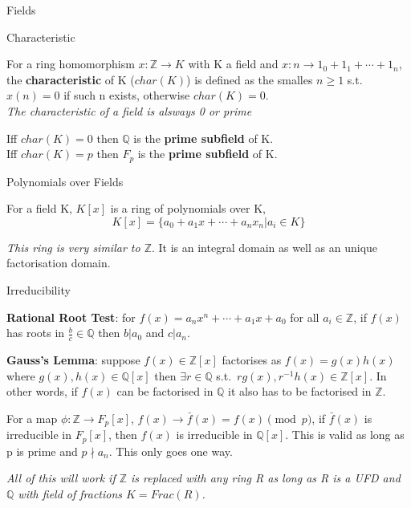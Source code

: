 \documentclass[12pt, letterpaper]{article}
\newcommand{\Q}{\mathbb{Q}}
\newcommand{\Z}{\mathbb{Z}}
\begin{document}
\begin{section}{Fields}

  \begin{subsection}{Characteristic}

    For a ring homomorphism \(x: \Z \to K\) with K a field and
    \(x: n \to 1_{0} + 1_{1} + \cdots + 1_{n}\), the  \textbf{characteristic}
    of K (\(char(K)\)) is defined as the smalles \(n \geq 1\) s.t. \(x(n) = 0\)
    if such n exists, otherwise \(char(K) = 0\). \\
    \textit{The characteristic of a field is alsways 0 or prime}

    Iff \(char(K) = 0\) then \(\Q\) is the \textbf{prime subfield} of
    K. \\
    Iff \(char(K) = p\) then \(F_{p}\) is the \textbf{prime subfield} of K.

  \end{subsection}

  \begin{subsection}{Polynomials over Fields}

    For a field K, \(K[x]\) is a ring of polynomials over K,
    \[K[x] = \{a_{0} + a_{1}x + \cdots + a_{n}x_{n} | a_{i} \in K\}{}\]

    \textit{This ring is very similar to \(\Z\)}. It is an integral
    domain as well as an unique factorisation domain.

    \begin{subsubsection}{Irreducibility}

      \textbf{Rational Root Test}: for \(f(x) = a_{n}x^{n} + \cdots + a_{1}x
      + a_{0}\) for all \(a_{i} \in \Z\), if \(f(x)\) has roots in
      \(\frac{b}{c} \in \Q\) then \(b | a_{0}\) and \(c | a_{n}\).

      \textbf{Gauss's Lemma}: suppose \(f(x) \in \Z[x]\) factorises as
      \(f(x) = g(x)h(x)\) where \(g(x), h(x) \in \Q[x]\) then \(\exists r
      \in \Q\) s.t.\ \(rg(x), r^{-1}h(x) \in \Z[x]\). In other
      words, if \(f(x)\) can be factorised in \(\Q\) it also has to be
      factorised in \(\Z\).

      For a map \(\phi: \Z \to F_{p}[x]\), \(f(x) \to \bar{f}(x) =
      f(x) \pmod{p}\), if \(\bar{f}(x)\) is irreducible in \(F_{p}[x]\), then
      \(f(x)\) is irreducible in \(\Q[x]\). This is valid as long as
      p is prime and \(p \nmid a_{n}\). This only goes one way.

      \textit{All of this will work if \(\Z\) is replaced with any ring
        R as long as R is a UFD and \(\Q\) with field of fractions
        \(K = Frac(R)\).}


\end{subsubsection}
\end{subsection}
\end{section}
\end{document}
